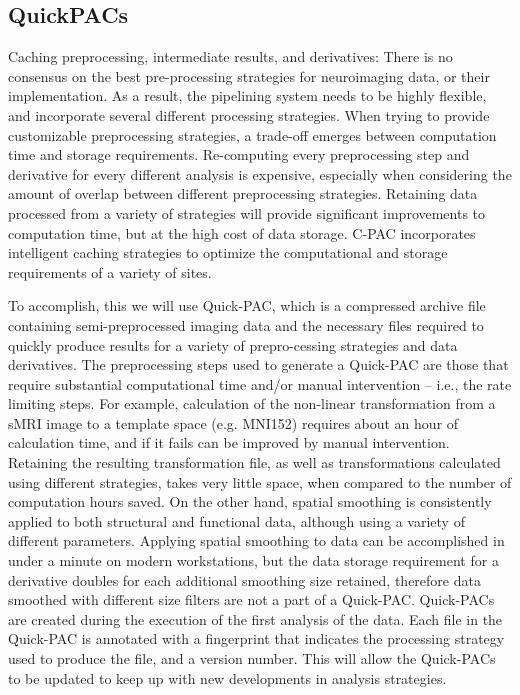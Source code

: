 \subsection{QuickPACs}
Caching preprocessing, intermediate results, and derivatives: There is no consensus on the best pre-processing strategies for neuroimaging data, or their implementation. As a result, the pipelining system needs to be highly flexible, and incorporate several different processing strategies. When trying to provide customizable preprocessing strategies, a trade-off emerges between computation time and storage requirements. Re-computing every preprocessing step and derivative for every different analysis is expensive, especially when considering the amount of overlap between different preprocessing strategies. Retaining data processed from a variety of strategies will provide significant improvements to computation time, but at the high cost of data storage. C-PAC incorporates intelligent caching strategies to optimize the computational and storage requirements of a variety of sites. 

To accomplish, this we will use Quick-PAC, which is a compressed archive file containing semi-preprocessed imaging data and the necessary files required to quickly produce results for a variety of prepro-cessing strategies and data derivatives. The preprocessing steps used to generate a Quick-PAC are those that require substantial computational time and/or manual intervention – i.e., the rate limiting steps. For example, calculation of the non-linear transformation from a sMRI image to a template space (e.g. MNI152) requires about an hour of calculation time, and if it fails can be improved by manual intervention. Retaining the resulting transformation file, as well as transformations calculated using different strategies, takes very little space, when compared to the number of computation hours saved. On the other hand, spatial smoothing is consistently applied to both structural and functional data, although using a variety of different parameters. Applying spatial smoothing to data can be accomplished in under a minute on modern workstations, but the data storage requirement for a derivative doubles for each additional smoothing size retained, therefore data smoothed with different size filters are not a part of a Quick-PAC. Quick-PACs are created during the execution of the first analysis of the data. Each file in the Quick-PAC is annotated with a fingerprint that indicates the processing strategy used to produce the file, and a version number. This will allow the Quick-PACs to be updated to keep up with new developments in analysis strategies.


